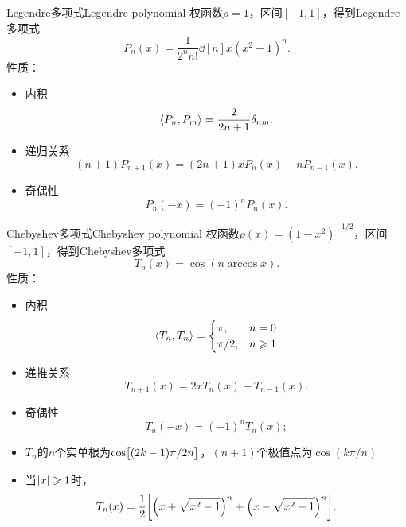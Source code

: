 \begin{example}
    {Legendre多项式}{Legendre polynomial}
    权函数$\rho = 1$，区间$[-1,1]$，得到Legendre多项式
    \begin{equation}
        P_n(x) = \frac1{2^nn!}\dd[n]x(x^2 - 1)^n.
    \end{equation}
    性质：
    \begin{itemize}
        \item 内积 
        \begin{equation}
            \langle P_n,P_m\rangle = \frac2{2n + 1}\delta_{nm}.
        \end{equation}
        \item 递归关系
        \begin{equation}
            (n + 1)P_{n+1}(x) = (2n + 1)xP_n(x) - nP_{n-1}(x).
        \end{equation}
        \item 奇偶性
        \begin{equation}
            P_n(-x) = (-1)^nP_n(x).
        \end{equation}
    \end{itemize}
\end{example}

\begin{example}
    {Chebyshev多项式}{Chebyshev polynomial}
    权函数$\rho(x) = (1 - x^2)^{-1/2}$，区间$[-1,1]$，得到Chebyshev多项式
    \begin{equation}
        T_n(x) = \cos(n\arccos x).
    \end{equation}
    性质：
    \begin{itemize}
        \item 内积 
        \begin{equation}
            \langle T_n,T_n\rangle = \begin{cases}
                \pi,&n = 0\\
                \pi/2,&n \geqslant 1
            \end{cases}
        \end{equation}
        \item 递推关系
        \begin{equation}
            T_{n+1}(x) = 2xT_n(x) - T_{n-1}(x).
        \end{equation}
        \item 奇偶性
        \begin{equation}
            T_n(-x) = (-1)^nT_n(x);
        \end{equation}
        \item $T_n$的$n$个实单根为$\cos\bigl[(2k - 1)\pi/2n\bigr]$，$(n + 1)$个极值点为$\cos(k\pi/n)$
        \item 当$\lvert x\rvert \geqslant 1$时，
        \begin{equation}
            T_n(x) = \frac12\biggl[\Bigl(x + \sqrt{x^2 - 1}\Bigr)^n + \Bigl(x - \sqrt{x^2 - 1}\Bigr)^n\biggr].
        \end{equation}
    \end{itemize}
\end{example}

